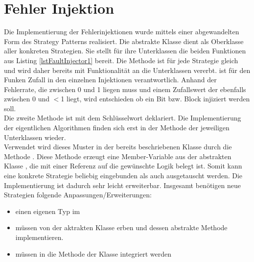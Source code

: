 \section{Fehler Injektion}

Die Implementierung der Fehlerinjektionen wurde mittels einer abgewandelten Form des Strategy Patterns realisiert. Die abstrakte Klasse  dient als Oberklasse aller  konkreten Strategien. Sie stellt für ihre Unterklassen die beiden Funktionen aus Listing \ref{lstFaultInjector1} bereit. Die Methode  ist f\"ur jede Strategie gleich und wird daher bereits mit Funktionalit\"at an die Unterklassen vererbt.  ist f\"ur den Funken Zufall in den einzelnen Injektionen verantwortlich. Anhand der Fehlerrate, die zwischen 0 und 1 liegen muss und einem Zufallswert der ebenfalls zwischen 0 und $<$1 liegt, wird entschieden ob ein Bit bzw. Block injiziert werden soll.\\
Die zweite Methode ist mit dem Schl\"usselwort  deklariert. Die Implementierung der eigentlichen Algorithmen finden sich erst in der Methode  der jeweiligen Unterklassen wieder.\\
Verwendet wird dieses Muster in der bereits beschriebenen Klasse  durch die Methode . Diese Methode erzeugt eine Member-Variable aus der abstrakten Klasse , die mit einer Referenz auf die gew\"unschte Logik belegt ist. Somit kann eine konkrete Strategie beliebig eingebunden als auch ausgetauscht werden. Die Implementierung ist dadurch sehr leicht erweiterbar. Insgesamt benötigen neue Strategien folgende Anpassungen/Erweiterungen:

\begin{itemize}
		\item einen eigenen Typ im 
		\item müssen von der aktrakten Klasse  erben und dessen abstrakte Methode  implementieren.
		\item müssen in die Methode  der Klasse  integriert werden
	\end{itemize}
	
\begin{figure}[!htb]
	
\end{figure}


